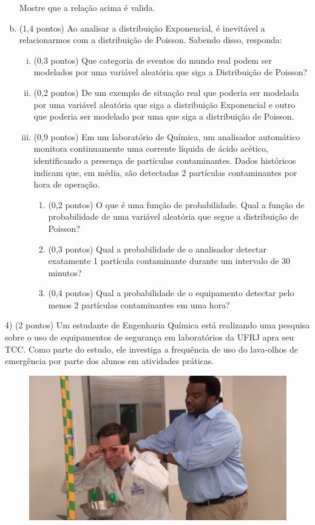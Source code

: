 \documentclass[12pt]{article}
\begin{document}
\begin{enumerate}[a)]
        Mostre que a relação acima é valida. 
    \item (1,4 pontos) Ao analisar a distribuição Exponencial, é inevitável a relacionarmos com a distribuição de Poisson. Sabendo disso, responda:
    \begin{enumerate}[i.)]
        \item (0,3 pontos) Que categoria de eventos do mundo real podem ser modelados por uma variável aleatória que siga a Distribuição de Poisson?
        \item (0,2 pontos) De um exemplo de situação real que poderia ser modelada por uma variável aleatória que siga a distribuição Exponencial
         e outro que poderia ser modelado por uma que siga a distribuição de Poisson.  
        \item (0,9 pontos) Em um laboratório de Química, um analisador automático monitora continuamente uma corrente líquida de ácido acético,
        identificando a presença de partículas contaminantes. Dados históricos indicam que, em média,
        são detectadas 2 partículas contaminantes por hora de operação.
        \begin{enumerate}[1)]
            \item (0,2 pontos) O que é uma função de probabilidade. Qual a função de probabilidade de uma variável aleatória que segue a distribuição de Poisson?
            \item (0,3 pontos) Qual a probabilidade de o analisador detectar exatamente 1 partícula contaminante durante um intervalo de 30 minutos?
            \item (0,4 pontos) Qual a probabilidade de o equipamento detectar pelo menos 2 partículas contaminantes em uma hora?
        \end{enumerate}
    \end{enumerate}
\end{enumerate}

\vspace{5px}

4) (2 pontos) Um estudante de Engenharia Química está realizando uma pesquisa sobre o uso de equipamentos de segurança em laboratórios da UFRJ apra seu TCC.
Como parte do estudo, ele investiga a frequência de uso do lava-olhos de emergência por parte dos alunos em atividades práticas.

   \begin{figure}[H]
        \centering
        \includegraphics[width=0.6\linewidth]{figures/lava_olhos.jpg}
    \end{figure}
\end{document}
